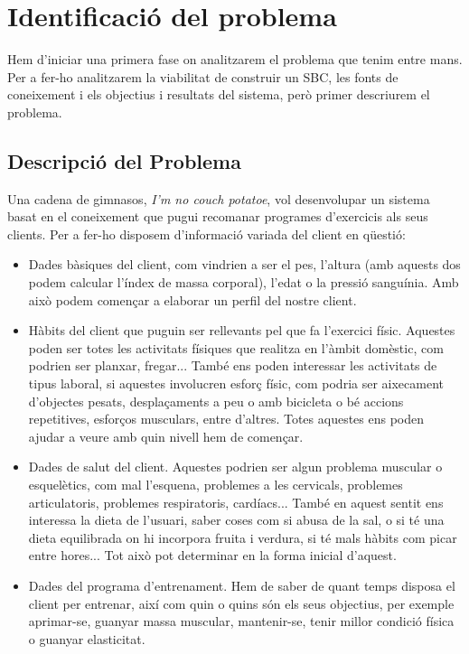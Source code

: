 \section{Identificació del problema}
Hem d'iniciar una primera fase on analitzarem el problema que tenim entre mans. Per a fer-ho analitzarem la viabilitat de construir un SBC, les fonts de coneixement i els objectius i resultats del sistema, però primer descriurem el problema.

\subsection{Descripció del Problema}
Una cadena de gimnasos, \textit{I'm no couch potatoe}, vol desenvolupar un sistema basat en el coneixement que pugui recomanar programes d'exercicis als seus clients. Per a fer-ho disposem d'informació variada del client en qüestió:

\begin{itemize}
    \item Dades bàsiques del client, com vindrien a ser el pes, l'altura (amb aquests dos podem calcular l'índex de massa corporal), l'edat o la pressió sanguínia. Amb això podem començar a elaborar un perfil del nostre client.
    \item Hàbits del client que puguin ser rellevants pel que fa l'exercici físic. Aquestes poden ser totes les activitats físiques que realitza en l'àmbit domèstic, com podrien ser planxar, fregar... També ens poden interessar les activitats de tipus laboral, si aquestes involucren esforç físic, com podria ser aixecament d'objectes pesats, desplaçaments a peu o amb bicicleta o bé accions repetitives, esforços musculars, entre d'altres. Totes aquestes ens poden ajudar a veure amb quin nivell hem de començar.
    \item Dades de salut del client. Aquestes podrien ser algun problema muscular o esquelètics, com mal l'esquena, problemes a les cervicals, problemes articulatoris, problemes respiratoris, cardíacs... També en aquest sentit ens interessa la dieta de l'usuari, saber coses com si abusa de la sal, o si té una dieta equilibrada on hi incorpora fruita i verdura, si té mals hàbits com picar entre hores... Tot això pot determinar en la forma inicial d'aquest.
    \item Dades del programa d'entrenament. Hem de saber de quant temps disposa el client per entrenar, així com quin o quins són els seus objectius, per exemple aprimar-se, guanyar massa muscular, mantenir-se, tenir millor condició física o guanyar elasticitat. 
\end{itemize}

